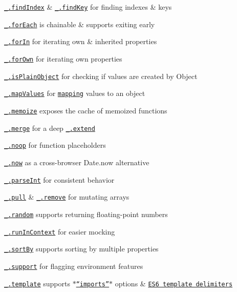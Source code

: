 \begin{DoxyItemize}
\item \href{https://lodash.com/docs#findIndex}{\tt \+\_\+.\+find\+Index} \& \href{https://lodash.com/docs#findKey}{\tt \+\_\+.\+find\+Key} for finding indexes \& keys
\item \href{https://lodash.com/docs#forEach}{\tt \+\_\+.\+for\+Each} is chainable \& supports exiting early
\item \href{https://lodash.com/docs#forIn}{\tt \+\_\+.\+for\+In} for iterating own \& inherited properties
\item \href{https://lodash.com/docs#forOwn}{\tt \+\_\+.\+for\+Own} for iterating own properties
\item \href{https://lodash.com/docs#isPlainObject}{\tt \+\_\+.\+is\+Plain\+Object} for checking if values are created by {\ttfamily Object}
\item \href{https://lodash.com/docs#mapValues}{\tt \+\_\+.\+map\+Values} for \href{https://lodash.com/docs#map}{\tt mapping} values to an object
\item \href{https://lodash.com/docs#memoize}{\tt \+\_\+.\+memoize} exposes the {\ttfamily cache} of memoized functions
\item \href{https://lodash.com/docs#merge}{\tt \+\_\+.\+merge} for a deep \href{https://lodash.com/docs#extend}{\tt \+\_\+.\+extend}
\item \href{https://lodash.com/docs#noop}{\tt \+\_\+.\+noop} for function placeholders
\item \href{https://lodash.com/docs#now}{\tt \+\_\+.\+now} as a cross-\/browser {\ttfamily Date.\+now} alternative
\item \href{https://lodash.com/docs#parseInt}{\tt \+\_\+.\+parse\+Int} for consistent behavior
\item \href{https://lodash.com/docs#pull}{\tt \+\_\+.\+pull} \& \href{https://lodash.com/docs#remove}{\tt \+\_\+.\+remove} for mutating arrays
\item \href{https://lodash.com/docs#random}{\tt \+\_\+.\+random} supports returning floating-\/point numbers
\item \href{https://lodash.com/docs#runInContext}{\tt \+\_\+.\+run\+In\+Context} for easier mocking
\item \href{https://lodash.com/docs#sortBy}{\tt \+\_\+.\+sort\+By} supports sorting by multiple properties
\item \href{https://lodash.com/docs#support}{\tt \+\_\+.\+support} for flagging environment features
\item \href{https://lodash.com/docs#template}{\tt \+\_\+.\+template} supports \href{https://lodash.com/docs#templateSettings_imports}{\tt $\ast$“imports”$\ast$} options \& \href{http://people.mozilla.org/~jorendorff/es6-draft.html#sec-literals-string-literals}{\tt E\+S6 template delimiters}

\end{DoxyItemize}
